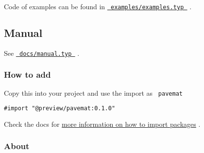 Code of examples can be found in
\href{https://github.com/QuadnucYard/pavemat/tree/main/examples}{\texttt{\ examples/examples.typ\ }}
.

\pandocbounded{}
\pandocbounded{}
\pandocbounded{}
\pandocbounded{}

\subsection{Manual}\label{manual}

See
\href{https://github.com/QuadnucYard/pavemat/tree/main/docs}{\texttt{\ docs/manual.typ\ }}
.

\subsubsection{How to add}\label{how-to-add}

Copy this into your project and use the import as \texttt{\ pavemat\ }

\begin{verbatim}
#import "@preview/pavemat:0.1.0"
\end{verbatim}



Check the docs for
\href{https://typst.app/docs/reference/scripting/\#packages}{more
information on how to import packages} .

\subsubsection{About}\label{about}

